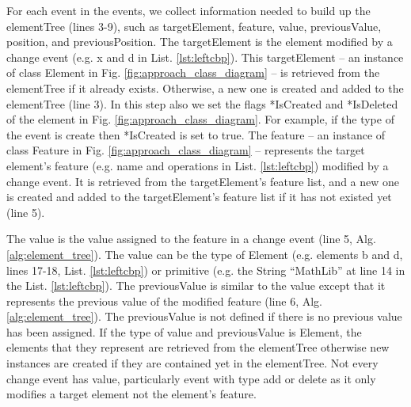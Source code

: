 \documentclass{llncs}
\begin{document}
For each \textsf{event} in the \textsf{events}, we collect information needed to build up the \textsf{elementTree}  (lines 3-9), such as \textsf{targetElement}, \textsf{feature}, \textsf{value}, \textsf{previousValue}, \textsf{position}, and \textsf{previousPosition}. The \textsf{targetElement} is the element modified by a change event (e.g. \textsf{x} and \textsf{d} in List. \ref{lst:leftcbp}). This \textsf{targetElement} -- an instance of class Element in Fig. \ref{fig:approach_class_diagram} -- is retrieved from the \textsf{elementTree} if it already exists. Otherwise, a new one is created and added to the \textsf{elementTree} (line 3). In this step also we set the flags \textsf{*IsCreated} and \textsf{*IsDeleted} of the element in Fig. \ref{fig:approach_class_diagram}. For example, if the type of the event is \textsf{create} then \textsf{*IsCreated} is set to \textsf{true}. The \textsf{feature} -- an instance of class Feature in Fig. \ref{fig:approach_class_diagram} -- represents the target element's feature (e.g. \textsf{name} and \textsf{operations} in List. \ref{lst:leftcbp}) modified by a change event. It is  retrieved from the \textsf{targetElement}'s feature list, and a new one is created and added to the \textsf{targetElement}'s feature list if it has not existed yet (line 5). 

The \textsf{value} is the value assigned to the feature in a change event (line 5, Alg. \ref{alg:element_tree}). The \textsf{value} can be the type of \textsf{Element} (e.g. elements \textsf{b} and  \textsf{d}, lines 17-18, List. \ref{lst:leftcbp}) or primitive (e.g. the String ``MathLib'' at line 14 in the List. \ref{lst:leftcbp}). The \textsf{previousValue} is similar to the \textsf{value} except that it represents the previous value of the modified feature (line 6, Alg. \ref{alg:element_tree}). The \textsf{previousValue} is not defined if there is no previous value has been assigned. If the type of \textsf{value} and \textsf{previousValue} is \textsf{Element}, the elements that they represent are retrieved from the \textsf{elementTree} otherwise new instances are created if they are contained yet in the \textsf{elementTree}. Not every change event has \textsf{value}, particularly event with type \textsf{add} or \textsf{delete} as it only modifies a target element not the element's feature.
\end{document}
